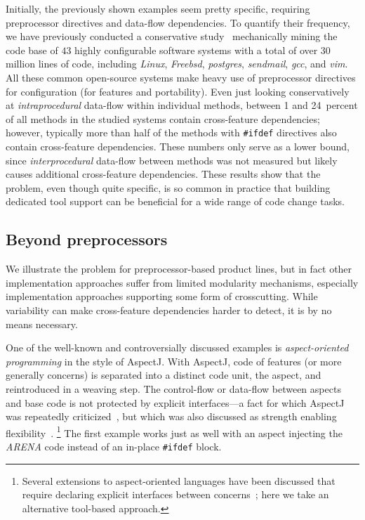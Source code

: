 Initially, the previously shown examples seem pretty specific, requiring preprocessor directives and data-flow dependencies. To quantify their frequency, we have previously conducted a conservative study~\cite{ribeiro-feature-dependencies-gpce11} mechanically mining the code base of $43$ highly configurable software systems with a total of over 30 million lines of code, including \textit{Linux}, \textit{Freebsd}, \textit{postgres}, \textit{sendmail}, \textit{gcc}, and \textit{vim}. All these common open-source systems make heavy use of preprocessor directives for configuration (for features and portability).
Even just looking conservatively at \textit{intraprocedural} data-flow within individual methods, between 1 and 24~percent of all methods in the studied systems contain cross-feature dependencies; however, typically more than half of the methods with \texttt{\#ifdef} directives also contain cross-feature dependencies. These numbers only serve as a lower bound, since \textit{interprocedural} data-flow between methods was not measured but likely causes additional cross-feature dependencies. These results show that the problem, even though quite specific, is so common in practice that building dedicated tool support can be beneficial for a wide range of code change tasks.



\subsection{Beyond preprocessors}
\label{sec:otherimpl}

We illustrate the problem for preprocessor-based product lines, but in fact other implementation approaches suffer from limited modularity mechanisms, especially implementation approaches supporting some form of crosscutting. While variability can make cross-feature dependencies harder to detect, it is by no means necessary.

One of the well-known and controversially discussed examples is \emph{aspect-oriented programming} in the style of AspectJ. With AspectJ, code of features (or more generally concerns) is separated into a distinct code unit, the aspect, and reintroduced in a weaving step. The control-flow or data-flow between aspects and base code is not protected by explicit interfaces---a fact for which AspectJ was repeatedly criticized~\cite{storzer-fragile-pointcut-04, S:OOPSLA06}, but which was also discussed as strength enabling flexibility~\cite{filman:oopsla-aop00}.%
\footnote{Several extensions to aspect-oriented languages have been discussed that require declaring explicit interfaces between concerns~\cite{SPAK:TOSEM10,join-point-interfaces-erics-esec-fse11,aldrich-open-modules-ecoop05,GSSSTCR:IEEESoftware06,rajan-ptolemy-ecoop08}; here we take an alternative tool-based approach.} The first example works just as well with an aspect injecting the \emph{ARENA} code instead of an in-place \texttt{\#ifdef} block.

